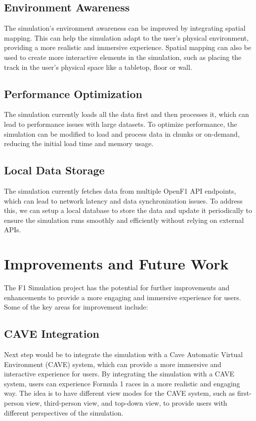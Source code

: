 \documentclass[
	a4paper, %
	10pt, %
	unnumberedsections, %
	twoside, %
]{LTJournalArticle}
\begin{document}
\subsection{Environment Awareness}
The simulation's environment awareness can be improved by integrating spatial mapping. This can help the simulation adapt to the user's physical environment, providing a more realistic and immersive experience. Spatial mapping can also be used to create more interactive elements in the simulation, such as placing the track in the user's physical space like a tabletop, floor or wall.
\subsection{Performance Optimization}
The simulation currently loads all the data first and then processes it, which can lead to performance issues with large datasets. To optimize performance, the simulation can be modified to load and process data in chunks or on-demand, reducing the initial load time and memory usage.

\subsection{Local Data Storage}
The simulation currently fetches data from multiple OpenF1 API endpoints, which can lead to network latency and data synchronization issues. To address this, we can setup a local database to store the data and update it periodically to ensure the simulation runs smoothly and efficiently without relying on external APIs.

\section{Improvements and Future Work}
The F1 Simulation project has the potential for further improvements and enhancements to provide a more engaging and immersive experience for users. Some of the key areas for improvement include:
\subsection{CAVE Integration}
Next step would be to integrate the simulation with a Cave Automatic Virtual Environment (CAVE) system, which can provide a more immersive and interactive experience for users. By integrating the simulation with a CAVE system, users can experience Formula 1 races in a more realistic and engaging way. The idea is to have different view modes for the CAVE system, such as first-person view, third-person view, and top-down view, to provide users with different perspectives of the simulation.
\end{document}
